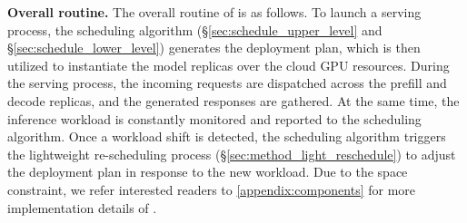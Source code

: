 
\textbf{Overall routine.} The overall routine of \sys is as follows.
 To launch a serving process, the scheduling algorithm (\S\ref{sec:schedule_upper_level} and \S\ref{sec:schedule_lower_level}) generates the deployment plan, which is then utilized to instantiate the model replicas over the cloud GPU resources. 
 During the serving process, the incoming requests are dispatched across the prefill and decode replicas, and the generated responses are gathered.
 At the same time, the inference workload is constantly monitored and reported to the scheduling algorithm.
 Once a workload shift is detected, the scheduling algorithm triggers the lightweight re-scheduling process (\S\ref{sec:method_light_reschedule}) to adjust the deployment plan in response to the new workload.
Due to the space constraint, we refer interested readers to \autoref{appendix:components} for more implementation details of \sys.




